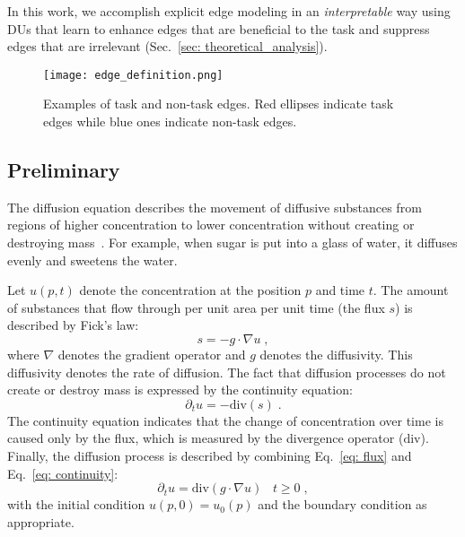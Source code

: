 \documentclass[a4paper,fleqn]{cas-dc}
\begin{document}
In this work, we accomplish explicit edge modeling in an \textit{interpretable} way using DUs that learn to enhance edges that are beneficial to the task and suppress edges that are irrelevant (Sec.~\ref{sec: theoretical_analysis}).
\begin{figure}[t]
    \centering
    \texttt{[image: edge\_definition.png]}
    \caption{Examples of task and non-task edges. Red ellipses indicate task edges while blue ones indicate non-task edges.}
    \label{fig: edge_def}
\end{figure}

\subsection{Preliminary}
The diffusion equation describes the movement of diffusive substances from regions of higher concentration to lower concentration without creating or destroying mass~\cite{weickert1998anisotropic}. 
For example, when sugar is put into a glass of water, it diffuses evenly and sweetens the water.

Let ${u}({p}, t)$ denote the concentration at the position ${p}$ and time $t$. 
The amount of substances that flow through per unit area per unit time (the flux $s$) is described by Fick's law:
\begin{equation}
    {s} = - g \cdot \nabla {u} \;, 
    \label{eq: flux}
\end{equation}
where $\nabla$ denotes the gradient operator and $g$ denotes the diffusivity. This diffusivity denotes the rate of diffusion. The fact that diffusion processes do not create or destroy mass is expressed by the continuity equation:
\begin{equation}
    \partial_t {u} = - \mathrm{div}({s}) \;.
    \label{eq: continuity}
\end{equation}
The continuity equation indicates that the change of concentration over time is caused only by the flux, which is measured by the divergence operator ($\mathrm{div}$). Finally, the diffusion process is described by combining Eq.~\eqref{eq: flux} and Eq.~\eqref{eq: continuity}: 
\begin{equation}
    \partial_t {u} = \mathrm{div} (g \cdot \nabla {u}) \;\;\; t \ge 0\;,
    \label{eq: diffusion_equation}
\end{equation}
with the initial condition ${u}({p},0)={u}_0({p})$ and the boundary condition as appropriate.  
\end{document}
